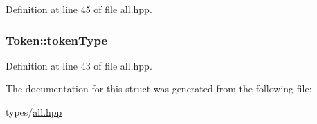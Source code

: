 Definition at line 45 of file all.\+hpp.

\hypertarget{struct_token_a3d2b3146021ae2acd9e1b33bf5e59c78}{}
\subsubsection[{token\+Type}]{ Token\+::token\+Type}\label{struct_token_a3d2b3146021ae2acd9e1b33bf5e59c78}


Definition at line 43 of file all.\+hpp.



The documentation for this struct was generated from the following file\+:\begin{DoxyCompactItemize}
\item 
types/\hyperlink{types_2all_8hpp}{all.\+hpp}\end{DoxyCompactItemize}
